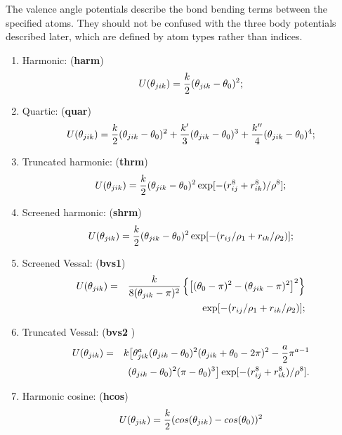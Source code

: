 The valence angle potentials describe the bond bending terms between
the specified atoms. They should not be confused with the three body
potentials described later, which are defined by atom types rather
than indices.
\begin{enumerate}
\item Harmonic:  ({\bf harm})
\begin{equation}
 U(\theta_{jik})= {k\over 2} (\theta_{jik} - \theta_0)^2;
\end{equation}
\item Quartic:  ({\bf quar})
\begin{equation}
 U(\theta_{jik})= {k\over 2}(\theta_{jik} - \theta_0)^2 + {k'\over
3}(\theta_{jik} -
\theta_0)^3 + {k''\over 4}(\theta_{jik} - \theta_0)^4;
\end{equation}
\item Truncated harmonic:  ({\bf thrm})
\begin{equation}
U(\theta_{jik})= {k\over 2} (\theta_{jik} - \theta_0)^2
\exp[-(r_{ij}^8 + r_{ik}^8)/\rho^8];
\end{equation}
\item Screened harmonic:  ({\bf shrm})
\begin{equation}
 U(\theta_{jik})= {k\over 2} (\theta_{jik} - \theta_0)^2
\exp[-(r_{ij}/\rho_1 + r_{ik}/\rho_2)] ;
\end{equation}
\item Screened Vessal\cite{vessal-94a}:  ({\bf bvs1})
\begin{eqnarray}
U(\theta_{jik})&=& {k \over 8(\theta_{jik}-\pi)^2}\left\{ \left[
(\theta_0 -\pi)^2 -(\theta_{jik}-\pi)^2\right]^2
\right\} \nonumber \\
& &  \exp[-(r_{ij}/\rho_1 + r_{ik}/\rho_2)];
\end{eqnarray}
\item Truncated Vessal\cite{smith-95a}: ({\bf bvs2 })
\begin{eqnarray}
U(\theta_{jik})&=& k\big[ \theta_{jik}^a (\theta_{jik}-\theta_0)^2
(\theta_{jik}+\theta_0-2\pi)^2  - {a\over 2} \pi^{a-1}\nonumber \\
& & (\theta_{jik}-\theta_0)^2(\pi - \theta_0)^3\big]
\exp[-(r_{ij}^8 + r_{ik}^8)/\rho^8].
\end{eqnarray}
\item Harmonic cosine: ({\bf hcos})
\begin{equation}
U(\theta_{jik})={k\over 2}(cos(\theta_{jik}) -cos(\theta_{0}))^{2}
\end{equation}

\end{enumerate}
